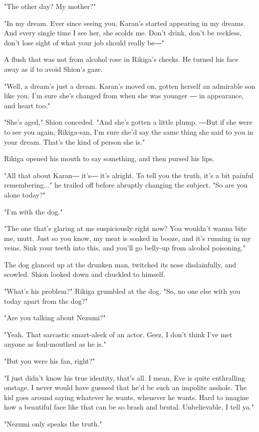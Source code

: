 "The other day? My mother?"

"In my dream. Ever since seeing you, Karan's started appearing in my
dreams. And every single time I see her, she scolds me. Don't drink,
don't be reckless, don't lose sight of what your job should really be―"

A flush that was not from alcohol rose in Rikiga's cheeks. He turned his
face away as if to avoid Shion's gaze.

"Well, a dream's just a dream. Karan's moved on, gotten herself an
admirable son like you. I'm sure she's changed from when she was younger
― in appearance, and heart too."

"She's aged," Shion conceded. "And she's gotten a little plump. ―But if
she were to see you again, Rikiga-san, I'm sure she'd say the same thing
she said to you in your dream. That's the kind of person she is."

Rikiga opened his mouth to say something, and then pursed his lips.

"All that about Karan― it's― it's alright. To tell you the truth, it's a
bit painful remembering..." he trailed off before abruptly changing the
subject. "So are you alone today?"

"I'm with the dog."

"The one that's glaring at me suspiciously right now? You wouldn't wanna
bite me, mutt. Just so you know, my meat is soaked in booze, and it's
running in my veins. Sink your teeth into this, and you'll go belly-up
from alcohol poisoning."

The dog glanced up at the drunken man, twitched its nose disdainfully,
and scowled. Shion looked down and chuckled to himself.

"What's his problem?" Rikiga grumbled at the dog. "So, no one else with
you today apart from the dog?"

"Are you talking about Nezumi?"

"Yeah. That sarcastic smart-aleck of an actor. Geez, I don't think I've
met anyone as foul-mouthed as he is."

"But you were his fan, right?"

"I just didn't know his true identity, that's all. I mean, Eve is quite
enthralling onstage. I never would have guessed that he'd be such an
impolite asshole. The kid goes around saying whatever he wants, whenever
he wants. Hard to imagine how a beautiful face like that can be so brash
and brutal. Unbelievable, I tell ya."

"Nezumi only speaks the truth."

